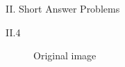 \documentclass[a4paper,12pt]{article}
\begin{document}
\begin{section}{II. Short Answer Problems}
\begin{subsection}{II.4}
\begin{figure}[!htb]
        \caption{Original image}
      \end{figure}
            \clearpage
      

\end{subsection}
\end{section}
\end{document}
